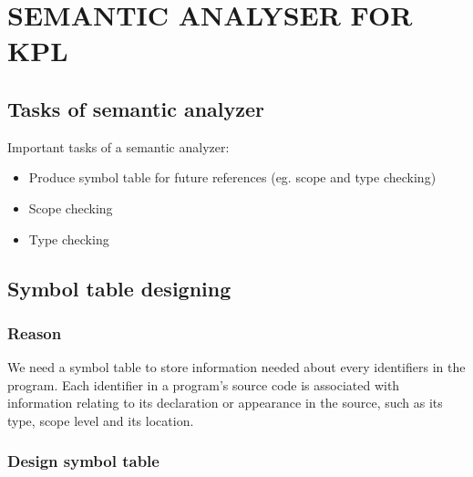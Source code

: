 \documentclass[12pt, a4paper]{report}
\begin{document}
	\chapter{SEMANTIC ANALYSER FOR KPL}
	\newpage
		\section{Tasks of semantic analyzer}
			\tab Important tasks of a semantic analyzer:
			\begin{itemize}
				\item Produce symbol table for future references (eg. scope and type checking)
				\item Scope checking
				\item Type checking
			\end{itemize}
		\section{Symbol table designing}
			\subsection{Reason}
				\tab We need a symbol table to store information needed about every identifiers in the program. Each identifier in a program's source code is associated with information relating to its declaration or appearance in the source, such as its type, scope level and its location.
			\subsection{Design symbol table}
\end{document}
